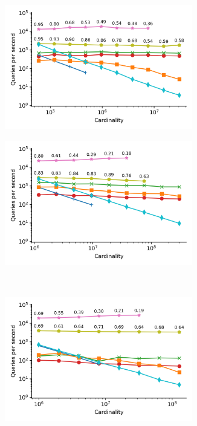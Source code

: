 \begin{figure}
    \begin{subfigure}[b]{0.47\textwidth}
        \includegraphics[width=0.9\textwidth]{plots/fashion-mnist_PermutedBall_10_throughput.png}
        \label{fig:results:fashion-mnist-scaling}
    \end{subfigure}%
    \begin{subfigure}[b]{0.47\textwidth}
        \includegraphics[width=0.9\textwidth]{plots/glove-25_PermutedBall_10_throughput.png}
        \label{fig:results:glove-25-scaling}
    \end{subfigure}%
    \\
    \begin{subfigure}[b]{0.47\textwidth}
        \includegraphics[width=0.9\textwidth]{plots/sift_PermutedBall_10_throughput.png}

\end{subfigure}
\end{figure}
